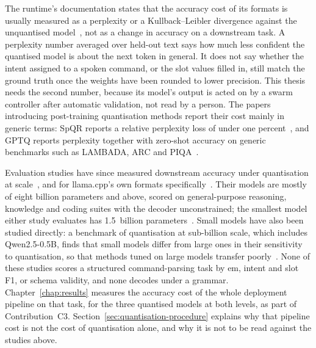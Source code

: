 The runtime's documentation states that the accuracy cost of its formats is usually measured as
a perplexity or a Kullback--Leibler divergence against the unquantised model~\cite{llamacpp},
not as a change in accuracy on a downstream task. A perplexity number averaged over held-out text
says how much less confident the quantised model is about the next token in general. It does not
say whether the intent assigned to a spoken command, or the slot values filled in, still match the
ground truth once the weights have been rounded to lower precision. This thesis needs the
second number, because its model's output is acted on by a swarm controller after automatic
validation, not read by a person. The papers introducing post-training quantisation methods report
their cost mainly in generic terms: SpQR reports a relative perplexity loss of under one
percent~\cite{spqr}, and GPTQ reports perplexity together with zero-shot accuracy on generic
benchmarks such as LAMBADA, ARC and PIQA~\cite{gptq}.

Evaluation studies have since measured downstream accuracy under quantisation at
scale~\cite{kurtic2025}, and for llama.cpp's own formats specifically~\cite{kurt2026}. Their
models are mostly of eight billion parameters and above, scored on general-purpose reasoning,
knowledge and coding suites with the decoder unconstrained; the smallest model either study
evaluates has 1.5~billion parameters~\cite{kurtic2025}. Small models have also been studied
directly: a benchmark of quantisation at sub-billion scale, which includes Qwen2.5-0.5B, finds that
small models differ from large ones in their sensitivity to quantisation, so that methods tuned on
large models transfer poorly~\cite{slmquant}. None of these studies scores a structured
command-parsing task by \gls{em}, intent and slot F1, or schema validity, and none decodes under
a grammar. Chapter~\ref{chap:results} measures the accuracy cost of the whole deployment pipeline
on that task, for the three quantised models at both levels, as part of Contribution~C3.
Section~\ref{sec:quantisation-procedure} explains why that pipeline cost is not the cost of
quantisation alone, and why it is not to be read against the studies above.

